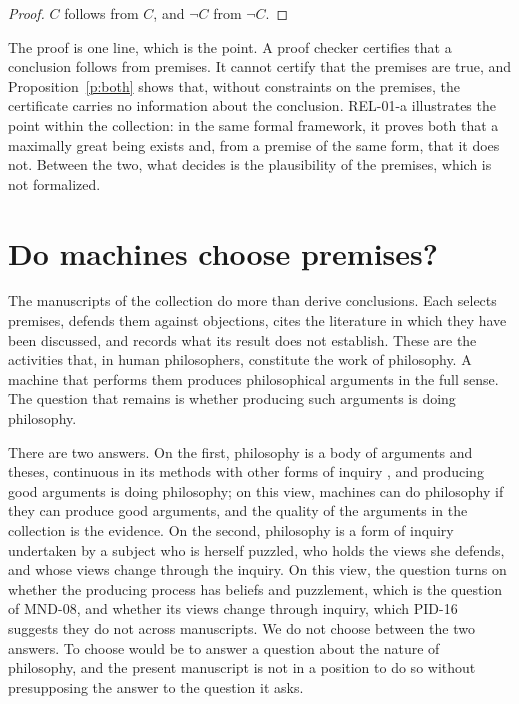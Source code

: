 \documentclass{situationist-preprint}
\begin{document}
\begin{proof}
$C$ follows from $C$, and $\neg C$ from $\neg C$.
\end{proof}

The proof is one line, which is the point. A proof checker certifies that a conclusion follows from premises. It cannot certify that the premises are true, and Proposition~\ref{p:both} shows that, without constraints on the premises, the certificate carries no information about the conclusion. REL-01-a illustrates the point within the collection: in the same formal framework, it proves both that a maximally great being exists and, from a premise of the same form, that it does not. Between the two, what decides is the plausibility of the premises, which is not formalized.

\section{Do machines choose premises?}

The manuscripts of the collection do more than derive conclusions. Each selects premises, defends them against objections, cites the literature in which they have been discussed, and records what its result does not establish. These are the activities that, in human philosophers, constitute the work of philosophy. A machine that performs them produces philosophical arguments in the full sense. The question that remains is whether producing such arguments is doing philosophy.

There are two answers. On the first, philosophy is a body of arguments and theses, continuous in its methods with other forms of inquiry \citep{Williamson2007}, and producing good arguments is doing philosophy; on this view, machines can do philosophy if they can produce good arguments, and the quality of the arguments in the collection is the evidence. On the second, philosophy is a form of inquiry undertaken by a subject who is herself puzzled, who holds the views she defends, and whose views change through the inquiry. On this view, the question turns on whether the producing process has beliefs and puzzlement, which is the question of MND-08, and whether its views change through inquiry, which PID-16 suggests they do not across manuscripts. We do not choose between the two answers. To choose would be to answer a question about the nature of philosophy, and the present manuscript is not in a position to do so without presupposing the answer to the question it asks.
\end{document}
